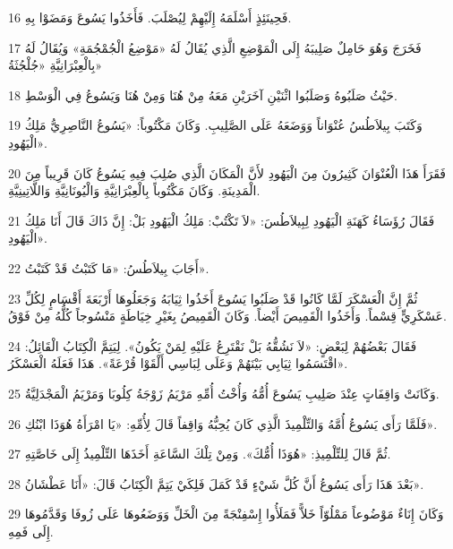 \par 16 فَحِينَئِذٍ أَسْلَمَهُ إِلَيْهِمْ لِيُصْلَبَ. فَأَخَذُوا يَسُوعَ وَمَضَوْا بِهِ.
\par 17 فَخَرَجَ وَهُوَ حَامِلٌ صَلِيبَهُ إِلَى الْمَوْضِعِ الَّذِي يُقَالُ لَهُ «مَوْضِعُ الْجُمْجُمَةِ» وَيُقَالُ لَهُ بِالْعِبْرَانِيَّةِ «جُلْجُثَةُ»
\par 18 حَيْثُ صَلَبُوهُ وَصَلَبُوا اثْنَيْنِ آخَرَيْنِ مَعَهُ مِنْ هُنَا وَمِنْ هُنَا وَيَسُوعُ فِي الْوَسْطِ.
\par 19 وَكَتَبَ بِيلاَطُسُ عُنْوَاناً وَوَضَعَهُ عَلَى الصَّلِيبِ. وَكَانَ مَكْتُوباً: «يَسُوعُ النَّاصِرِيُّ مَلِكُ الْيَهُودِ».
\par 20 فَقَرَأَ هَذَا الْعُنْوَانَ كَثِيرُونَ مِنَ الْيَهُودِ لأَنَّ الْمَكَانَ الَّذِي صُلِبَ فِيهِ يَسُوعُ كَانَ قَرِيباً مِنَ الْمَدِينَةِ. وَكَانَ مَكْتُوباً بِالْعِبْرَانِيَّةِ وَالْيُونَانِيَّةِ وَاللَّاتِينِيَّةِ.
\par 21 فَقَالَ رُؤَسَاءُ كَهَنَةِ الْيَهُودِ لِبِيلاَطُسَ: «لاَ تَكْتُبْ: مَلِكُ الْيَهُودِ بَلْ: إِنَّ ذَاكَ قَالَ أَنَا مَلِكُ الْيَهُودِ».
\par 22 أَجَابَ بِيلاَطُسُ: «مَا كَتَبْتُ قَدْ كَتَبْتُ».
\par 23 ثُمَّ إِنَّ الْعَسْكَرَ لَمَّا كَانُوا قَدْ صَلَبُوا يَسُوعَ أَخَذُوا ثِيَابَهُ وَجَعَلُوهَا أَرْبَعَةَ أَقْسَامٍ لِكُلِّ عَسْكَرِيٍّ قِسْماً. وَأَخَذُوا الْقَمِيصَ أَيْضاً. وَكَانَ الْقَمِيصُ بِغَيْرِ خِيَاطَةٍ مَنْسُوجاً كُلُّهُ مِنْ فَوْقُ.
\par 24 فَقَالَ بَعْضُهُمْ لِبَعْضٍ: «لاَ نَشُقُّهُ بَلْ نَقْتَرِعُ عَلَيْهِ لِمَنْ يَكُونُ». لِيَتِمَّ الْكِتَابُ الْقَائِلُ: «اقْتَسَمُوا ثِيَابِي بَيْنَهُمْ وَعَلَى لِبَاسِي أَلْقَوْا قُرْعَةً». هَذَا فَعَلَهُ الْعَسْكَرُ.
\par 25 وَكَانَتْ وَاقِفَاتٍ عِنْدَ صَلِيبِ يَسُوعَ أُمُّهُ وَأُخْتُ أُمِّهِ مَرْيَمُ زَوْجَةُ كِلُوبَا وَمَرْيَمُ الْمَجْدَلِيَّةُ.
\par 26 فَلَمَّا رَأَى يَسُوعُ أُمَّهُ وَالتِّلْمِيذَ الَّذِي كَانَ يُحِبُّهُ وَاقِفاً قَالَ لِأُمِّهِ: «يَا امْرَأَةُ هُوَذَا ابْنُكِ».
\par 27 ثُمَّ قَالَ لِلتِّلْمِيذِ: «هُوَذَا أُمُّكَ». وَمِنْ تِلْكَ السَّاعَةِ أَخَذَهَا التِّلْمِيذُ إِلَى خَاصَّتِهِ.
\par 28 بَعْدَ هَذَا رَأَى يَسُوعُ أَنَّ كُلَّ شَيْءٍ قَدْ كَمَلَ فَلِكَيْ يَتِمَّ الْكِتَابُ قَالَ: «أَنَا عَطْشَانُ».
\par 29 وَكَانَ إِنَاءٌ مَوْضُوعاً مَمْلُوّاً خَلاًّ فَمَلَأُوا إِسْفِنْجَةً مِنَ الْخَلِّ وَوَضَعُوهَا عَلَى زُوفَا وَقَدَّمُوهَا إِلَى فَمِهِ.

